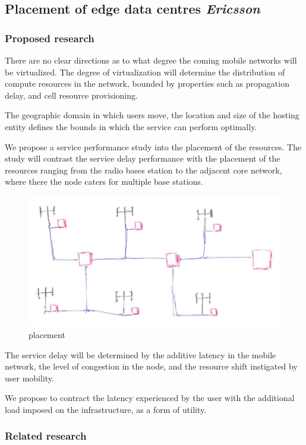\subsection{Placement of edge data centres \emph{Ericsson}}
\subsubsection{Proposed research}
There are no clear directions as to what degree the coming mobile networks will be virtualized. The degree of virtualization will determine the distribution of compute resources in the network, bounded by properties such as propagation delay, and cell resource provisioning.

The geographic domain in which users move, the location and size of the \xcloud hosting entity defines the bounds in which the service can perform optimally.

We propose a service performance study into the placement of the \xcloud resources. The study will contrast the service delay performance with the placement of the \xcloud resources ranging from the radio bases station to the adjacent core network, where there the \xcloud node caters for multiple base stations.

\begin{figure}
	\centering
	\includegraphics[width=\linewidth]{placement_diagram.jpg}
	\caption{\xcloud placement}
	\label{diagram_placement}
\end{figure}

The service delay will be determined by the additive latency in the mobile network, the level of congestion in the \xcloud node, and the resource shift instigated by user mobility.

We propose to contract the latency experienced by the user with the additional load imposed on the \xcloud infrastructure, as a form of utility.
\subsubsection{Related research}